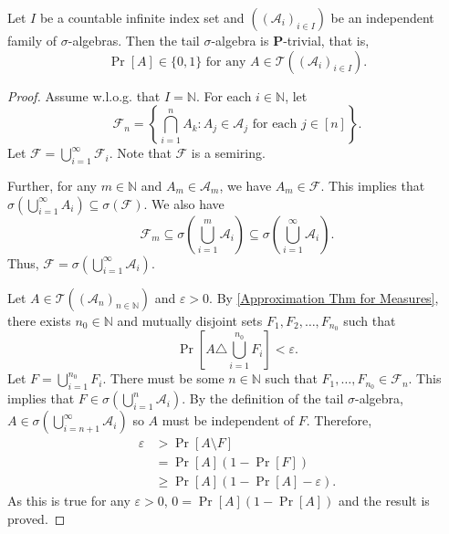 \begin{theorem}
    Let $I$ be a countable infinite index set and $((\mathcal{A}_i)_{i\in I})$ be an independent family of $\sigma$-algebras. Then the tail $\sigma$-algebra is $\textbf{P}$-trivial, that is,
    $$\Pr[A]\in\{0,1\}\text{ for any }A\in\mathcal{T}((\mathcal{A}_i)_{i\in I}).$$
\end{theorem}
\begin{proof}
    Assume w.l.o.g. that $I=\mathbb{N}$. For each $i\in\mathbb{N}$, let
    $$\mathcal{F}_n = \left\{\bigcap_{i=1}^n A_k: A_j\in\mathcal{A}_j\text{ for each }j\in[n]\right\}.$$
    Let $\mathcal{F}=\bigcup_{i=1}^\infty \mathcal{F}_i$. Note that $\mathcal{F}$ is a semiring.
    
    \vspace{1mm}
    Further, for any $m\in\mathbb{N}$ and $A_m\in\mathcal{A}_m$, we have $A_m\in\mathcal{F}$. This implies that $\sigma\left(\bigcup_{i=1}^\infty A_i\right)\subseteq\sigma(\mathcal{F})$. We also have
    $$\mathcal{F}_m\subseteq\sigma\left(\bigcup_{i=1}^m \mathcal{A}_i\right)\subseteq\sigma\left(\bigcup_{i=1}^\infty \mathcal{A}_i\right).$$
    Thus, $\mathcal{F} = \sigma\left(\bigcup_{i=1}^\infty \mathcal{A}_i\right)$.
    
    Let $A\in\mathcal{T}((\mathcal{A}_n)_{n\in\mathbb{N}})$ and $\varepsilon>0$. By \ref{Approximation Thm for Measures}, there exists $n_0\in\mathbb{N}$ and mutually disjoint sets $F_1,F_2,\ldots,F_{n_0}$ such that $$\Pr\left[A\triangle \bigcup_{i=1}^{n_0}F_i\right]<\varepsilon.$$
    Let $F=\bigcup_{i=1}^{n_0}F_i$. There must be some $n\in\mathbb{N}$ such that $F_1,\ldots,F_{n_0}\in \mathcal{F}_n$. This implies that $F\in\sigma(\bigcup_{i=1}^n \mathcal{A}_i)$. By the definition of the tail $\sigma$-algebra, $A\in\sigma(\bigcup_{i=n+1}^\infty\mathcal{A}_i)$ so $A$ must be independent of $F$. Therefore,
    \begin{align*}
        \varepsilon &> \Pr[A\setminus F] \\
        &= \Pr[A](1-\Pr[F]) \\
        &\geq \Pr[A](1-\Pr[A]-\varepsilon).
    \end{align*}
    As this is true for any $\varepsilon>0$, $0=\Pr[A](1-\Pr[A])$ and the result is proved.
\end{proof}

\clearpage